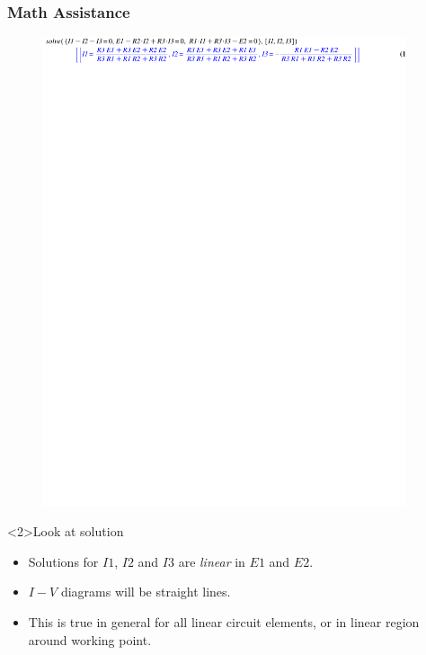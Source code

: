\documentclass[beamer]{standalone}
\begin{document}
\begin{frame}
 \frametitle{Math Assistance}
 \begin{figure}
  \includegraphics[trim=0 25cm 0 0,clip=true,width=0.95\textwidth]{./pics/Maple_tutorial_solving_equations.pdf}
 \end{figure}
 \begin{block}<2>{Look at solution}
  \begin{itemize}
   \item Solutions for $I1$, $I2$ and $I3$ are \emph{linear} in $E1$ and $E2$.
   \item $I-V$ diagrams will be straight lines.
   \item This is true in general for all linear circuit elements, or in linear region around working point.
  \end{itemize}
 \end{block}
\end{frame}
\end{document}
